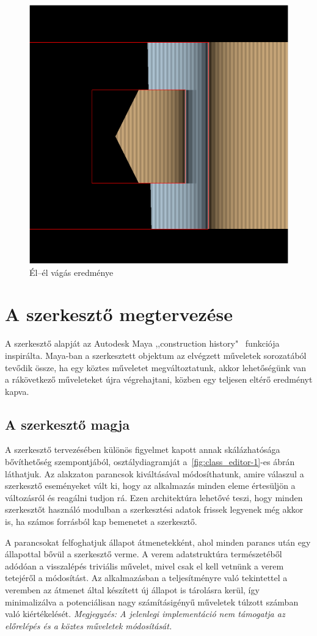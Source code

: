 \begin{figure}[H]
	\centering
	\includegraphics[width=.55\linewidth]{images/segment_segment_cut.png}
	\caption{Él--él vágás eredménye}
	\label{fig:segment_segment_cut-1}
\end{figure}

\section{A szerkesztő megtervezése}
A szerkesztő alapját az Autodesk Maya ,,construction history"~\cite{mayaconstructionhistory} funkciója inspirálta. Maya-ban a szerkesztett objektum az elvégzett műveletek sorozatából tevődik össze, ha egy köztes műveletet megváltoztatunk, akkor lehetőségünk van a rákövetkező műveleteket újra végrehajtani, közben egy teljesen eltérő eredményt kapva.

\subsection{A szerkesztő magja}

A szerkesztő tervezésében különös figyelmet kapott annak skálázhatósága bővíthetőség szempontjából, osztálydiagramját a~\ref{fig:class_editor-1}-es ábrán láthatjuk. Az alakzaton parancsok kiváltásával módosíthatunk, amire válaszul a szerkesztő eseményeket vált ki, hogy az alkalmazás minden eleme értesüljön a változásról és reagálni tudjon rá. Ezen architektúra lehetővé teszi, hogy minden szerkesztőt használó modulban a szerkesztési adatok frissek legyenek még akkor is, ha számos forrásból kap bemenetet a szerkesztő.

A parancsokat felfoghatjuk állapot átmenetekként, ahol minden parancs után egy állapottal bővül a szerkesztő verme. A verem adatstruktúra természetéből adódóan a visszalépés triviális művelet, mivel csak el kell vetnünk a verem tetejéről a módosítást. Az alkalmazásban a teljesítményre való tekintettel a veremben az átmenet által készített új állapot is tárolásra kerül, így minimalizálva a potenciálisan nagy számításigényű műveletek túlzott számban való kiértékelését. \textit{Megjegyzés: A jelenlegi implementáció nem támogatja az előrelépés és a köztes műveletek módosítását.}

